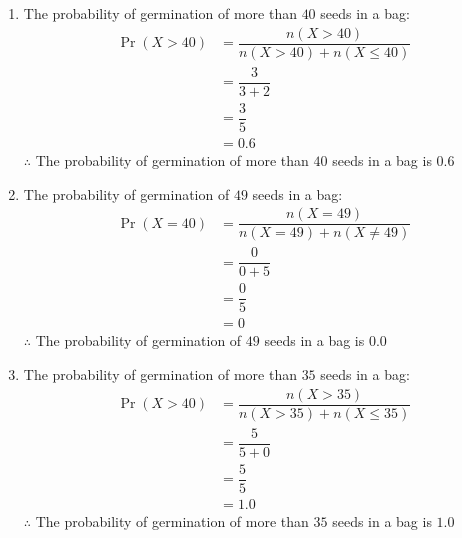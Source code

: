 \documentclass[journal,12pt,twocolumn]{IEEEtran}
\providecommand{\pr}[1]{\ensuremath{\Pr\left(#1\right)}}
\begin{document}
	\begin{enumerate}[label=(\roman*)]
    \item The probability of germination of more than $40$ seeds in a bag:
	\begin{align}
	\pr{X > 40} &= \dfrac{n(X>40)}{n(X>40) + n(X\le40)} \\
	&= \dfrac{3}{3+2} \\
	&= \dfrac{3}{5} \\
	&= 0.6
	\end{align}
	$\therefore$ The probability of germination of more than $40$ seeds in a bag is $0.6$
	
	\item The probability of germination of $49$ seeds in a bag:
	\begin{align}
	\pr{X = 40} &= \dfrac{n(X=49)}{n(X=49) + n(X \neq 49)} \\
	&= \dfrac{0}{0+5} \\
	&= \dfrac{0}{5}   \\
	&= 0
	\end{align}
	$\therefore$ The probability of germination of $49$ seeds in a bag is $0.0$
	
	\item The probability of germination of more than $35$ seeds in a bag:
	\begin{align}
	\pr{X > 40} &= \dfrac{n(X>35)}{n(X>35) + n(X\le35)} \\
	&= \dfrac{5}{5+0} \\
	&= \dfrac{5}{5}  \\
	&= 1.0
	\end{align}
	$\therefore$ The probability of germination of more than $35$ seeds in a bag is $1.0$
	
	\end{enumerate}
	
\end{document}
